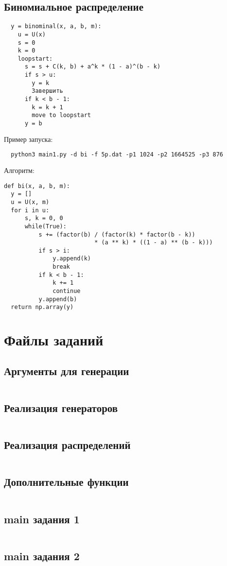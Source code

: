 \documentclass[spec, och, labwork]{shiza}
\begin{document}
\subsection{Биномиальное распределение}
\begin{verbatim}
  y = binominal(x, a, b, m):
    u = U(x)
    s = 0
    k = 0
    loopstart:
      s = s + C(k, b) + a^k * (1 - a)^(b - k)
      if s > u:
        y = k
        Завершить
      if k < b - 1:
        k = k + 1
        move to loopstart
      y = b
  \end{verbatim}
Пример запуска:
\begin{small}
\begin{verbatim}
  python3 main1.py -d bi -f 5p.dat -p1 1024 -p2 1664525 -p3 876  
 \end{verbatim}
\end{small}

Алгоритм:
\begin{small}
\begin{verbatim}
def bi(x, a, b, m):
  y = []
  u = U(x, m)
  for i in u:
      s, k = 0, 0
      while(True):
          s += (factor(b) / (factor(k) * factor(b - k)) 
                          * (a ** k) * ((1 - a) ** (b - k)))
          if s > i:
              y.append(k)
              break
          if k < b - 1:
              k += 1
              continue
          y.append(b)
  return np.array(y)

\end{verbatim}
\end{small}


\newpage
\appendix
    \section{Файлы заданий}
    \subsection{Аргументы для генерации}
    \inputminted[fontsize=\scriptsize]{text}{../tasks/args.py}
    \subsection{Реализация генераторов}
    \inputminted[fontsize=\scriptsize]{text}{../tasks/generators.py}
    \subsection{Реализация распределений}
    \inputminted[fontsize=\scriptsize]{text}{../tasks/distribution.py}
    \subsection{Дополнительные функции}
    \inputminted[fontsize=\scriptsize]{text}{../tasks/utils.py}
    \subsection{main задания 1}
    \inputminted[fontsize=\scriptsize]{text}{../tasks/main.py}
    \subsection{main задания 2}
    \inputminted[fontsize=\scriptsize]{text}{../tasks/main1.py}
\end{document}
